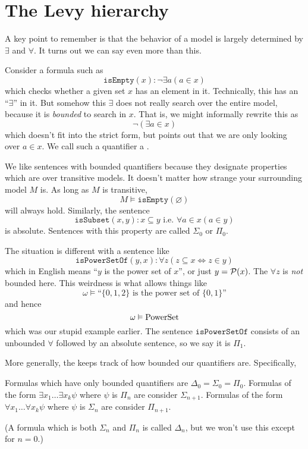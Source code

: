 \section{The Levy hierarchy}
A key point to remember is that the behavior of a model is largely determined by $\exists$ and $\forall$.
It turns out we can say even more than this.

Consider a formula such as
\[ \mathtt{isEmpty}(x) : \neg \exists a (a \in x) \]
which checks whether a given set $x$ has an element in it.
Technically, this has an ``$\exists$'' in it.
But somehow this $\exists$ does not really search over the entire model,
because it is \emph{bounded} to search in $x$.
That is, we might informally rewrite this as
\[ \neg (\exists a \in x) \]
which doesn't fit into the strict form,
but points out that we are only looking over $a \in x$.
We call such a quantifier a .

We like sentences with bounded quantifiers because they designate
properties which are  over transitive models.
It doesn't matter how strange your surrounding model $M$ is.
As long as $M$ is transitive, 
\[ M \vDash \mathtt{isEmpty}(\varnothing) \]
will always hold.
Similarly, the sentence
\[ \mathtt{isSubset}(x,y) : x \subseteq y \text { i.e. } \forall a \in x (a \in y) \]
is absolute.
Sentences with this property are called $\Sigma_0$ or $\Pi_0$.

The situation is different with a sentence like
\[
	\mathtt{isPowerSetOf}(y,x) :
	\forall z \left( z \subseteq x \iff z \in y  \right)
\]
which in English means ``$y$ is the power set of $x$'', or just $y = \mathcal P(x)$.
The $\forall z$ is \emph{not} bounded here.
This weirdness is what allows things like
\[ \omega \vDash \text{``$\{0,1,2\}$ is the power set of $\{0,1\}$''} \]
and hence
\[ \omega \vDash \mathrm{PowerSet} \]
which was our stupid example earlier.
The sentence $\mathtt{isPowerSetOf}$ consists of an unbounded $\forall$ followed
by an absolute sentence, so we say it is $\Pi_1$.

More generally, the  keeps track of how bounded our
quantifiers are.
Specifically,
\begin{itemize}
	\ii Formulas which have only bounded quantifiers are $\Delta_0 = \Sigma_0 = \Pi_0$.
	\ii Formulas of the form $\exists x_1 \dots \exists x_k \psi$ where $\psi$ is $\Pi_n$
	are consider $\Sigma_{n+1}$.
	\ii Formulas of the form $\forall x_1 \dots \forall x_k \psi$ where $\psi$ is $\Sigma_n$
	are consider $\Pi_{n+1}$.
\end{itemize}
(A formula which is both $\Sigma_n$ and $\Pi_n$ is called $\Delta_n$, but we won't
use this except for $n=0$.)

